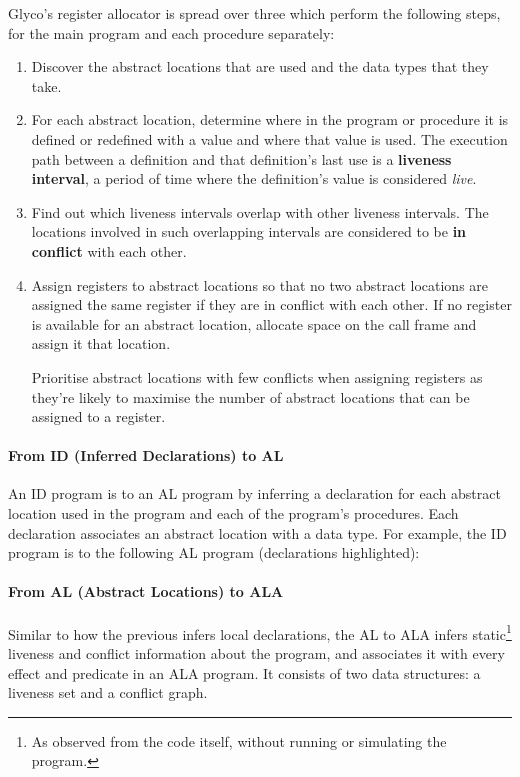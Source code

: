 \documentclass[main.tex]{subfiles}
\begin{document}
Glyco's register allocator is spread over three  which perform the following steps, for the main program and each procedure separately:
\begin{enumerate}
	\item Discover the abstract locations that are used and the data types that they take.
	\item For each abstract location, determine where in the program or procedure it is defined or redefined with a value and where that value is used. The execution path between a definition and that definition's last use is a \textbf{liveness interval}, a period of time where the definition's value is considered \emph{live}.
	\item Find out which liveness intervals overlap with other liveness intervals. The locations involved in such overlapping intervals are considered to be \textbf{in conflict} with each other.
	\item Assign registers to abstract locations so that no two abstract locations are assigned the same register if they are in conflict with each other. If no register is available for an abstract location, allocate space on the call frame and assign it that location.
	
	Prioritise abstract locations with few conflicts when assigning registers as they're likely to maximise the number of abstract locations that can be assigned to a register.
\end{enumerate}

\paragraph{From ID (Inferred Declarations) to AL} An ID program is \lowered{} to an AL program by inferring a declaration for each abstract location used in the program and each of the program's procedures. Each declaration associates an abstract location with a data type. For example, the ID program
is \lowered{} to the following AL program (declarations highlighted):

\paragraph{From AL (Abstract Locations) to ALA} Similar to how the previous  infers local declarations, the AL to ALA  infers static\footnote{As observed from the code itself, without running or simulating the program.} liveness and conflict information about the program, and associates it with every effect and predicate in an ALA program. It consists of two data structures: a liveness set and a conflict graph.
\end{document}
